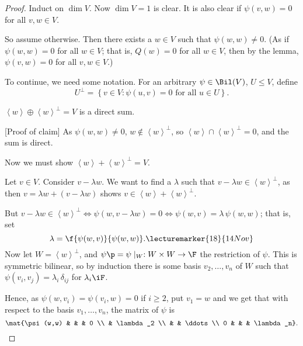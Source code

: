\begin{proof}
	Induct on $\dim V$. Now $\dim V=1$ is clear. It is also clear if $\psi(v,w) = 0 $ for all $v,w \in V$.%

	So assume otherwise. Then there exists a $w \in V$ such that $\psi(w,w)\neq 0$. (As if $\psi(w,w)=0$ for all $w\in V$; that is, $Q(w)=0$ for all $w\in V$, then by the lemma, $\psi(v,w)=0$ for all $v,w\in V$.) %

\bigskip

To continue, we need some notation. For an arbitrary $\psi\in\Bil(V)$, $U\leq V$, define
\begin{equation*}
	U^\perp = \left\{v\in V : \psi(u,v) = 0 \text{ for all } u\in U\right\}.
\end{equation*}

\begin{claim}
	$\left\langle w \right\rangle \oplus \left\langle w \right\rangle^\perp = V$ is a direct sum. %
\end{claim}


	[Proof of claim] As $\psi(w,w)\neq 0$, $w\not\in\left\langle w \right\rangle^\perp$, so $\left\langle w \right\rangle\cap\left\langle w \right\rangle^\perp = 0$, and the sum is direct. %
	
	Now we must show $\left\langle w \right\rangle + \left\langle w \right\rangle^\perp = V$. %
	
	Let $v\in V$. Consider $v-\lambda w$. We want to find a $\lambda$ such that $v-\lambda w\in\left\langle w \right\rangle^\perp$, as then $v=\lambda w+\left( v-\lambda w \right)$ shows $v\in\left\langle w \right\rangle+\left\langle w \right\rangle^\perp$. %

	But $v-\lambda w\in\left\langle w \right\rangle^\perp \iff \psi(w,v-\lambda w) = 0 \iff \psi(w,v) = \lambda\,\psi(w,w)$; that is, set %
	\begin{equation*}
		\lambda = \f{\psi(w,v)}{\psi(w,w)}.
		\lecturemarker{18}{14 Nov}
	\end{equation*}
	Now let $W=\left\langle w \right\rangle^\perp$, and $\psi\p = \psi\mid_W: W \times W \to \F$ the restriction of $\psi$. This is symmetric bilinear, so by induction there is some basis $v_2,\ldots,v_n$ of $W$ such that $\psi(v_i,v_j) = \lambda_i \, \delta_{ij}$ for $\lambda_i \iF$. %

	Hence, as $\psi(w,v_i) = \psi(v_i,w) = 0$ if $i\geq 2$, put $v_1=w$ and we get that with respect to the basis $v_1,\ldots,v_n$, the matrix of $\psi$ is %
	\begin{equation*}
		\mat{\psi(w,w) & & & 0 \\ & \lambda_2 \\ & & \ddots \\ 0 & & & \lambda_n}. \qedhere
	\end{equation*}
\end{proof}

